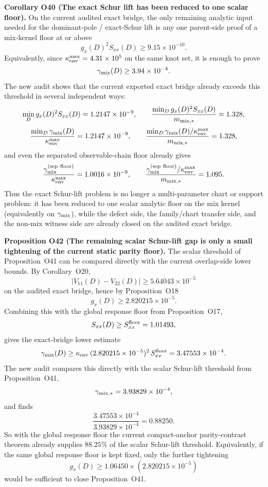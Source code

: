 \documentclass[aps,prd,onecolumn,notitlepage,nofootinbib,superscriptaddress,11pt,floatfix]{revtex4-2}
\begin{document}
\medskip\noindent\textbf{Corollary O40 (The exact Schur lift has been reduced to one scalar floor).}
On the current audited exact bridge, the only remaining analytic input needed for the dominant-pole / exact-Schur lift is any one parent-side proof of a mix-kernel floor at or above
\[
g_x(D)^2S_{xx}(D)\ge 9.15\times10^{-10}.
\]
Equivalently, since \(\kappa_{\rm env}^{\max}=4.31\times10^{5}\) on the same knot set, it is enough to prove
\[
\gamma_{\rm mix}(D)\ge 3.94\times10^{-4}.
\]
The new audit 
shows that the current exported exact bridge already exceeds this threshold in several independent ways:
\[
\min_D g_x(D)^2S_{xx}(D)=1.2147\times10^{-9},
\qquad
\frac{\min_D g_x(D)^2S_{xx}(D)}{m_{{\rm mix},\ast}}=1.328,
\]
\[
\frac{\min_D\gamma_{\rm mix}(D)}{\kappa_{\rm env}^{\max}}
=1.2147\times10^{-9},
\qquad
\frac{\min_D\gamma_{\rm mix}(D)/\kappa_{\rm env}^{\max}}{m_{{\rm mix},\ast}}=1.328,
\]
and even the separated observable-chain floor already gives
\[
\frac{\gamma_{\rm mix}^{\rm(sep\ floor)}}{\kappa_{\rm env}^{\max}}
=1.0016\times10^{-9},
\qquad
\frac{\gamma_{\rm mix}^{\rm(sep\ floor)}/\kappa_{\rm env}^{\max}}{m_{{\rm mix},\ast}}=1.095.
\]
Thus the exact Schur-lift problem is no longer a multi-parameter chart or support problem: it has been reduced to one scalar analytic floor on the mix kernel (equivalently on \(\gamma_{\rm mix}\)), while the defect side, the family/chart transfer side, and the non-mix witness side are already closed on the audited exact bridge.

\medskip\noindent\textbf{Proposition O42 (The remaining scalar Schur-lift gap is only a small tightening of the current static parity floor).}
The scalar threshold of Proposition~O41 can be compared directly with the current overlap-side lower bounds.  By Corollary~O20,
\[
|V_{11}(D)-V_{22}(D)|\ge 5.64043\times10^{-5}
\]
on the audited exact bridge, hence by Proposition~O18
\[
g_x(D)\ge 2.820215\times10^{-5}.
\]
Combining this with the global response floor from Proposition~O17,
\[
S_{xx}(D)\ge S_{xx}^{\rm floor}=1.01493,
\]
gives the exact-bridge lower estimate
\[
\gamma_{\rm mix}(D)\ge
\kappa_{\rm env}\,(2.820215\times10^{-5})^2\,S_{xx}^{\rm floor}
=3.47553\times10^{-4}.
\]
The new audit
compares this directly with the scalar Schur-lift threshold from Proposition~O41,
\[
\gamma_{{\rm mix},\ast}=3.93829\times10^{-4},
\]
and finds
\[
\frac{3.47553\times10^{-4}}{3.93829\times10^{-4}}=0.88250.
\]
So with the global response floor the current compact-anchor parity-contrast theorem already supplies \(88.25\%\) of the scalar Schur-lift threshold.  Equivalently, if the same global response floor is kept fixed, only the further tightening
\[
g_x(D)\ge 1.06450\times (2.820215\times10^{-5})
\]
would be sufficient to close Proposition~O41.
\end{document}

